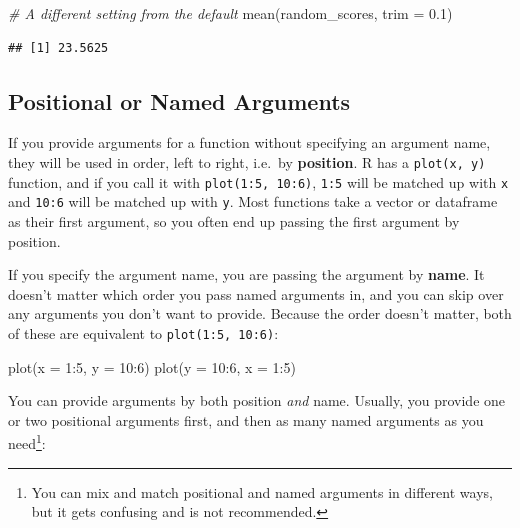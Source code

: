 \documentclass[
]{book}
\newenvironment{Shaded}{\begin{snugshade}}{\end{snugshade}}
\newcommand{\AttributeTok}[1]{\textcolor[rgb]{0.77,0.63,0.00}{#1}}
\newcommand{\CommentTok}[1]{\textcolor[rgb]{0.56,0.35,0.01}{\textit{#1}}}
\newcommand{\DecValTok}[1]{\textcolor[rgb]{0.00,0.00,0.81}{#1}}
\newcommand{\FloatTok}[1]{\textcolor[rgb]{0.00,0.00,0.81}{#1}}
\newcommand{\FunctionTok}[1]{\textcolor[rgb]{0.00,0.00,0.00}{#1}}
\newcommand{\NormalTok}[1]{#1}
\newcommand{\SpecialCharTok}[1]{\textcolor[rgb]{0.00,0.00,0.00}{#1}}
\begin{document}
\begin{Shaded}
\begin{Highlighting}[]
\CommentTok{\# A different setting from the default}
\FunctionTok{mean}\NormalTok{(random\_scores, }\AttributeTok{trim =} \FloatTok{0.1}\NormalTok{)}
\end{Highlighting}
\end{Shaded}

\begin{verbatim}
## [1] 23.5625
\end{verbatim}

\hypertarget{positional-or-named-arguments}{%
\subsection{Positional or Named Arguments}\label{positional-or-named-arguments}}

If you provide arguments for a function without specifying an argument name,
they will be used in order, left to right, i.e.~by \textbf{position}. R has a
\texttt{plot(x,\ y)} function, and if you call it with \texttt{plot(1:5,\ 10:6)}, \texttt{1:5}
will be matched up with \texttt{x} and \texttt{10:6} will be matched up with \texttt{y}. Most
functions take a vector or dataframe as their first argument, so you often
end up passing the first argument by position.

If you specify the argument name, you are passing the argument by \textbf{name}.
It doesn't matter which order you pass named arguments in, and you can
skip over any arguments you don't want to provide. Because the order doesn't
matter, both of these are equivalent to \texttt{plot(1:5,\ 10:6)}:

\begin{Shaded}
\begin{Highlighting}[]
\FunctionTok{plot}\NormalTok{(}\AttributeTok{x =} \DecValTok{1}\SpecialCharTok{:}\DecValTok{5}\NormalTok{, }\AttributeTok{y =} \DecValTok{10}\SpecialCharTok{:}\DecValTok{6}\NormalTok{)}
\FunctionTok{plot}\NormalTok{(}\AttributeTok{y =} \DecValTok{10}\SpecialCharTok{:}\DecValTok{6}\NormalTok{, }\AttributeTok{x =} \DecValTok{1}\SpecialCharTok{:}\DecValTok{5}\NormalTok{)}
\end{Highlighting}
\end{Shaded}

You can provide arguments by both position \emph{and} name. Usually, you
provide one or two positional arguments first, and then as many named
arguments as you need\footnote{You can mix and match positional and named arguments in
  different ways, but it gets confusing and is not recommended.}:
\end{document}
